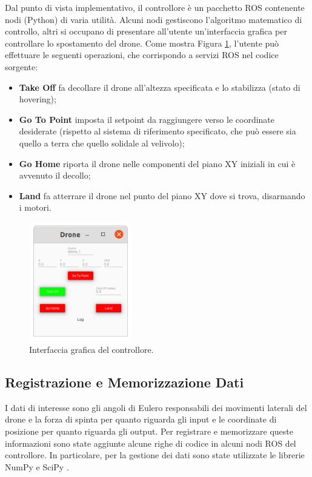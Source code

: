 Dal punto di vista implementativo, il controllore è un pacchetto \acs{ROS} contenente nodi (Python) di varia utilità. Alcuni nodi gestiscono l'algoritmo matematico di controllo, altri si occupano di presentare all'utente un'interfaccia grafica per controllare lo spostamento del drone. Come mostra Figura \ref{fig:drone_controller}, l'utente può effettuare le seguenti operazioni, che corrispondo a servizi \acs{ROS} nel codice sorgente:
\begin{itemize}
	\item \textbf{Take Off} fa decollare il drone all'altezza specificata e lo stabilizza (stato di hovering);
	\item \textbf{Go To Point} imposta il setpoint da raggiungere verso le coordinate desiderate (rispetto al sistema di riferimento specificato, che può essere sia quello a terra che quello solidale al velivolo);
	\item \textbf{Go Home} riporta il drone nelle componenti del piano XY iniziali in cui è avvenuto il decollo;
	\item \textbf{Land} fa atterrare il drone nel punto del piano XY dove si trova, disarmando i motori.
\end{itemize}

\begin{figure}[H]
	\centering
	\includegraphics[width=0.4\textwidth]{gfx/ROS/drone_controller}
	\caption[Interfaccia grafica del controllore.]{Interfaccia grafica del controllore.}
	\label{fig:drone_controller}
\end{figure}

\subsection{Registrazione e Memorizzazione Dati}
I dati di interesse sono gli angoli di Eulero responsabili dei movimenti laterali del drone e la forza di spinta per quanto riguarda gli input e le coordinate di posizione per quanto riguarda gli output. Per registrare e memorizzare queste informazioni sono state aggiunte alcune righe di codice in alcuni nodi \acs{ROS} del controllore. In particolare, per la gestione dei dati sono state utilizzate le librerie NumPy \cite{numPy} e SciPy \cite{sciPy}.\\

